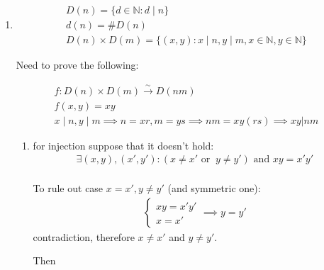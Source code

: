 \documentclass[12pt]{article}
\begin{document}
\begin{enumerate}
        Since $P'$ is not divisible by any elements of $S$ but it must have a factor that satisfies conditions above it means contradiction, therefore $S$ is not finite.
  \item
        \[
        \begin{gathered}
          D(n) = \{d \in \mathbb{N} \colon d \mid n\} \\
          d(n) = \#D(n) \\
          D(n) \times D(m) = \{(x, y) \colon x \mid n, y \mid m, x \in \mathbb{N}, y \in \mathbb{N} \}
        \end{gathered}
        \]

        Need to prove the following:

        \[
        \begin{gathered}
        f \colon D(n) \times D(m) \xrightarrow{\sim} D(nm) \\
        f(x,y) = xy \\
        x \mid n, y \mid m \implies n=xr, m=ys \implies nm=xy(rs) \implies xy | nm
        \end{gathered}
        \]

        \begin{enumerate}
          \item for injection suppose that it doesn't hold:
                \[
                \begin{gathered}
                  \exists (x, y), (x', y')\colon (x \neq x' \text{ or } \ y \neq y') \text{ and } xy=x'y' \\
                \end{gathered}
                \]

                To rule out case $x = x', y \neq y'$ (and symmetric one):
                \[
                \begin{gathered}
                  \begin{cases}
                    xy = x'y' \\
                    x = x'
                  \end{cases}
                  \implies y = y'
                \end{gathered}
                \]
                contradiction, therefore $x \neq x'$ and $y \neq y'$.


                Then


\end{enumerate}
\end{enumerate}
\end{document}
